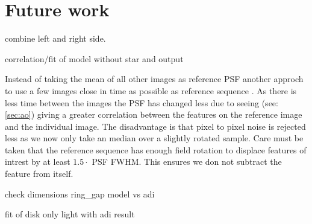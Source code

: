 \section{Future work}
\label{chap:future}
combine left and right side.

correlation/fit of model without star and output

Instead of taking the mean of all other images as reference \ac{PSF} another approch to use a few images close in time as possible as reference sequence \cite{Marois_2006}. As there is less time between the images the \ac{PSF} has changed less due to seeing  (see: \autoref{sec:ao}) giving a greater correlation between the features on the reference image and the individual image. The disadvantage is that pixel to pixel noise is rejected less as we now only take an median over a slightly rotated sample. Care must be taken that the reference sequence has enough field rotation to displace features of intrest by at least $1.5 \cdot$ \ac{PSF} \ac{FWHM}. This ensures we don not subtract the feature from itself. 

check dimensions ring_gap model vs adi

fit of disk only light with adi result
